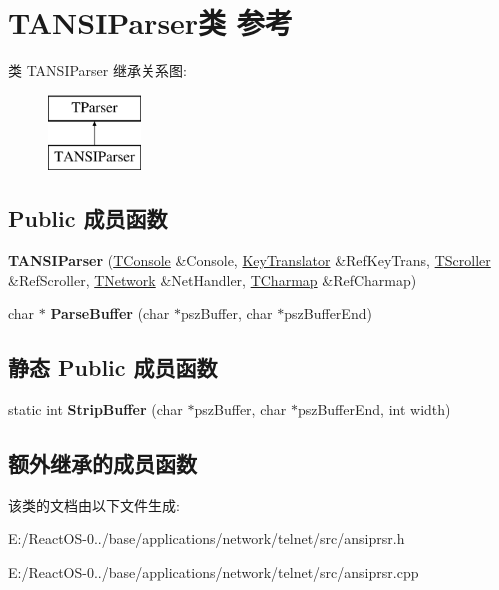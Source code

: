 \hypertarget{class_t_a_n_s_i_parser}{}\section{T\+A\+N\+S\+I\+Parser类 参考}
\label{class_t_a_n_s_i_parser}
类 T\+A\+N\+S\+I\+Parser 继承关系图\+:\begin{figure}[H]
\begin{center}
\leavevmode
\includegraphics[height=2.000000cm]{class_t_a_n_s_i_parser}
\end{center}
\end{figure}
\subsection*{Public 成员函数}
\begin{DoxyCompactItemize}
\item 
\mbox{\label{class_t_a_n_s_i_parser_a9d195fade15dbe1876760ad795345b45}} 
{\bfseries T\+A\+N\+S\+I\+Parser} (\hyperlink{class_t_console}{T\+Console} \&Console, \hyperlink{class_key_translator}{Key\+Translator} \&Ref\+Key\+Trans, \hyperlink{class_t_scroller}{T\+Scroller} \&Ref\+Scroller, \hyperlink{class_t_network}{T\+Network} \&Net\+Handler, \hyperlink{class_t_charmap}{T\+Charmap} \&Ref\+Charmap)
\item 
\mbox{\label{class_t_a_n_s_i_parser_a27fe6fa34bc296a9982e098d62ce2a55}} 
char $\ast$ {\bfseries Parse\+Buffer} (char $\ast$psz\+Buffer, char $\ast$psz\+Buffer\+End)
\end{DoxyCompactItemize}
\subsection*{静态 Public 成员函数}
\begin{DoxyCompactItemize}
\item 
\mbox{\label{class_t_a_n_s_i_parser_a7e04919aa924715df7b78b909040253a}} 
static int {\bfseries Strip\+Buffer} (char $\ast$psz\+Buffer, char $\ast$psz\+Buffer\+End, int width)
\end{DoxyCompactItemize}
\subsection*{额外继承的成员函数}


该类的文档由以下文件生成\+:\begin{DoxyCompactItemize}
\item 
E\+:/\+React\+O\+S-\/0../base/applications/network/telnet/src/ansiprsr.\+h\item 
E\+:/\+React\+O\+S-\/0../base/applications/network/telnet/src/ansiprsr.\+cpp\end{DoxyCompactItemize}
